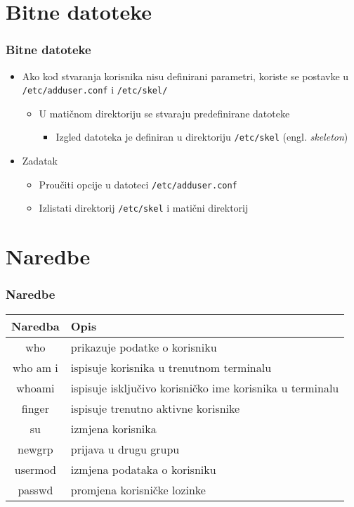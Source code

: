 \documentclass[table,usenames,dvipsnames] {beamer}
\newcommand{\shell}[1]{\texttt{#1}}
\begin{document}
\section{Bitne datoteke}
\begin{frame}[t]
\frametitle{Bitne datoteke}
\begin{itemize}
  \item Ako kod stvaranja korisnika nisu definirani parametri, koriste se 
        postavke u \shell{/etc/adduser.conf} i \shell{/etc/skel/}
  \begin{itemize}
    \item U matičnom direktoriju se stvaraju predefinirane datoteke
    \begin{itemize}
      \item Izgled datoteka je definiran u direktoriju \shell{/etc/skel}
               (engl. \emph{skeleton})
    \end{itemize}
  \end{itemize}
  \item Zadatak
  \begin{itemize}
    \item Proučiti opcije u datoteci \shell{/etc/adduser.conf}
    \item Izlistati direktorij \shell{/etc/skel} i matični direktorij
  \end{itemize}
\end{itemize}
\end{frame}

\section{Naredbe}
\begin{frame}[t]
	\frametitle{Naredbe}
	\begin{table}[h]
		\begin{tabular}{|c|l|}
			\hline
			\rowcolor{BlueViolet!20}Naredba & Opis \\
			\hline
			who & prikazuje podatke o korisniku \\
			\hline
			who am i & ispisuje korisnika u trenutnom terminalu \\
			\hline
			whoami & ispisuje isključivo korisničko ime korisnika u terminalu \\
			\hline
			finger & ispisuje trenutno aktivne korisnike \\
			\hline
			su & izmjena korisnika \\
			\hline
			newgrp & prijava u drugu grupu \\
			\hline
			usermod & izmjena podataka o korisniku \\
			\hline
			passwd & promjena korisničke lozinke \\
			\hline
		\end{tabular}
	\end{table}
\end{frame}
\end{document}
